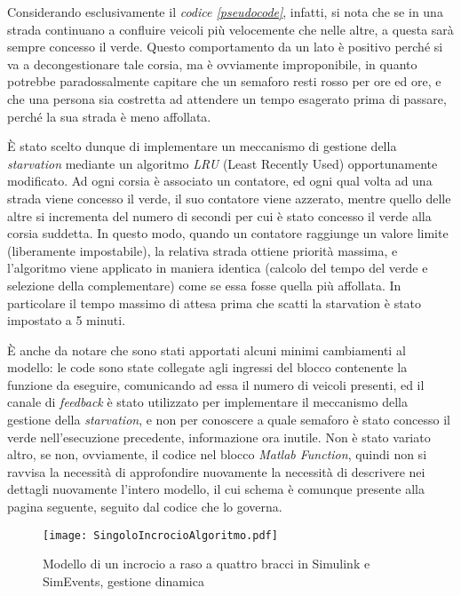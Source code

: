Considerando esclusivamente il \textit{codice \ref{pseudocode}}, infatti, si nota che se in una strada continuano a confluire veicoli più velocemente che nelle altre, a questa sarà sempre concesso il verde. Questo comportamento da un lato è positivo perché si va a decongestionare tale corsia, ma è ovviamente improponibile, in quanto potrebbe paradossalmente capitare che un semaforo resti rosso per ore ed ore, e che una persona sia costretta ad attendere un tempo esagerato prima di passare, perché la sua strada è meno affollata.

È stato scelto dunque di implementare un meccanismo di gestione della \textit{starvation} mediante un algoritmo \textit{LRU} (Least Recently Used) opportunamente modificato. Ad ogni corsia è associato un contatore, ed ogni qual volta ad una strada viene concesso il verde, il suo contatore viene azzerato, mentre quello delle altre si incrementa del numero di secondi per cui è stato concesso il verde alla corsia suddetta. In questo modo, quando un contatore raggiunge un valore limite (liberamente impostabile), la relativa strada ottiene priorità massima, e l’algoritmo viene applicato in maniera identica (calcolo del tempo del verde e selezione della complementare) come se essa fosse quella più affollata. In particolare il tempo massimo di attesa prima che scatti la starvation è stato impostato a 5 minuti.

È anche da notare che sono stati apportati alcuni minimi cambiamenti al modello: le code sono state collegate agli ingressi del blocco contenente la funzione da eseguire, comunicando ad essa il numero di veicoli presenti, ed il canale di \textit{feedback} è stato utilizzato per implementare il meccanismo della gestione della \textit{starvation}, e non per conoscere a quale semaforo è stato concesso il verde nell’esecuzione precedente, informazione ora inutile. Non è stato variato altro, se non, ovviamente, il codice nel blocco \textit{Matlab Function}, quindi non si ravvisa la necessità di approfondire nuovamente la necessità di descrivere nei dettagli nuovamente l'intero modello, il cui schema è comunque presente alla pagina seguente, seguito dal codice che lo governa.

\begin{figure}[H]
  \texttt{[image: SingoloIncrocioAlgoritmo.pdf]}
  \caption{Modello di un incrocio a raso a quattro bracci in Simulink e SimEvents, gestione dinamica}
  \label{fig:modellosingoloincrocioalgoritmo}
\end{figure}
\newpage

